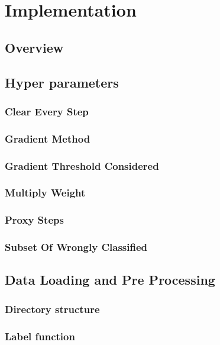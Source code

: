 
\chapter{Implementation}
\section{Overview}
\section{Hyper parameters}
\subsection{Clear Every Step}

\subsection{Gradient Method}

\subsection{Gradient Threshold Considered}

\subsection{Multiply Weight }

\subsection{Proxy Steps}

\subsection{Subset Of Wrongly Classified}

\section{Data Loading and Pre Processing}
\subsection{Directory structure}

\subsection{Label function}

